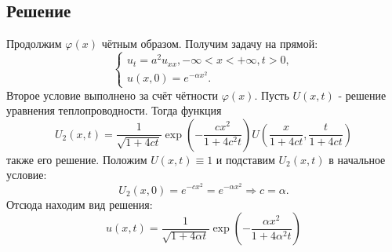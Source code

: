 \documentclass[11pt]{article}
\begin{document}
\subsection{Решение}
\label{sec:org30d2dc5}
Продолжим $\varphi(x)$ чётным образом. Получим задачу на прямой:
\begin{equation}
\begin{cases}
u_t = a^2u_{xx}, -\infty < x < +\infty, t > 0, \\
u(x, 0) = e^{-\alpha x^2}.
\end{cases}
\end{equation}
Второе условие выполнено за счёт чётности $\varphi(x)$.
Пусть $U(x, t)$ - решение уравнения теплопроводности. Тогда функция
\begin{equation*}
U_2(x, t) = \frac1{\sqrt{1 + 4ct}}\exp\left(-\frac{cx^2}{1 + 4c^2t}\right)U\left(\frac{x}{1 + 4ct}, \frac{t}{1 + 4ct}\right)
\end{equation*}
также его решение. Положим $U(x, t) \equiv 1$ и подставим $U_2(x, t)$ в начальное условие:
\begin{equation*}
U_2(x, 0) = e^{-cx^2} = e^{-\alpha x^2} \Rightarrow c = \alpha.
\end{equation*}
Отсюда находим вид решения:
\begin{equation}
u(x, t) = \frac1{\sqrt{1 + 4\alpha t}}\exp\left(-\frac{\alpha x^2}{1 + 4\alpha^2t}\right)
\end{equation}
\end{document}
